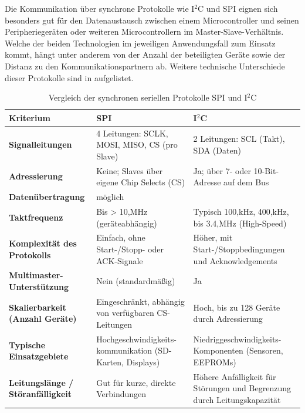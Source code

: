 Die Kommunikation \"uber synchrone Protokolle wie I$^{2}$C und SPI eignen sich besonders gut f\"ur den Datenaustausch zwischen einem Microcontroller und seinen Peripherieger\"aten oder weiteren Microcontrollern im Master-Slave-Verh\"altnis. Welche der beiden Technologien im jeweiligen Anwendungsfall zum Einsatz kommt, h\"angt unter anderem von der Anzahl der beteiligten Ger\"ate sowie der Distanz zu den Kommunikationspartnern ab. Weitere technische Unterschiede dieser Protokolle sind in  aufgelistet.

\begin{table}[h!]
	\small
	\centering
	\begin{tabular}{|p{4.5cm}|p{4.5cm}|p{4.5cm}|}
		\hline
		\textbf{Kriterium} & \textbf{SPI} & \textbf{I$^{2}$C} \\\hline
		\textbf{Signalleitungen} & 4 Leitungen: SCLK, MOSI, MISO, CS (pro Slave) & 2 Leitungen: SCL (Takt), SDA (Daten) \\\hline
		\textbf{Adressierung} & Keine; Slaves \"uber eigene Chip Selects (CS) & Ja; \"uber 7- oder 10-Bit-Adresse auf dem Bus \\\hline
		\textbf{Daten\"ubertragung} & \Fachbegriff[Gleichzeitige Daten\"ubertragung in beide Richtungen]{Vollduplex} m\"oglich & \Fachbegriff[Daten\"ubertragung zu einem Zeitpunkt nur in eine Richtung m\"oglich]{Halbduplex} \\\hline
		\textbf{Taktfrequenz} & Bis > 10,MHz (ger\"ateabh\"angig) & Typisch 100,kHz, 400,kHz, bis 3.4,MHz (High-Speed) \\\hline
		\textbf{Komplexit\"at des Protokolls} & Einfach, ohne Start-/Stopp- oder ACK-Signale & H\"oher, mit Start-/Stoppbedingungen und Acknowledgements \\\hline
		\textbf{Multimaster-Unterst\"utzung} & Nein (standardm\"aßig) & Ja \\\hline
		\textbf{Skalierbarkeit (Anzahl Ger\"ate)} & Eingeschr\"ankt, abh\"angig von verf\"ugbaren CS-Leitungen & Hoch, bis zu 128 Ger\"ate durch Adressierung \\\hline
		\textbf{Typische Einsatzgebiete} & Hochgeschwindigkeits-kommunikation (\zB SD-Karten, Displays) & Niedriggeschwindigkeits-Komponenten (\zB Sensoren, EEPROMs) \\\hline
		\textbf{Leitungsl\"ange / St\"oranf\"alligkeit} & Gut f\"ur kurze, direkte Verbindungen & H\"ohere Anf\"alligkeit f\"ur St\"orungen und Begrenzung durch Leitungskapazit\"at \\\hline
	\end{tabular}
	\caption{Vergleich der synchronen seriellen Protokolle SPI und I$^{2}$C\\}
	\label{tab:synchrone_protokolle}
\end{table}

